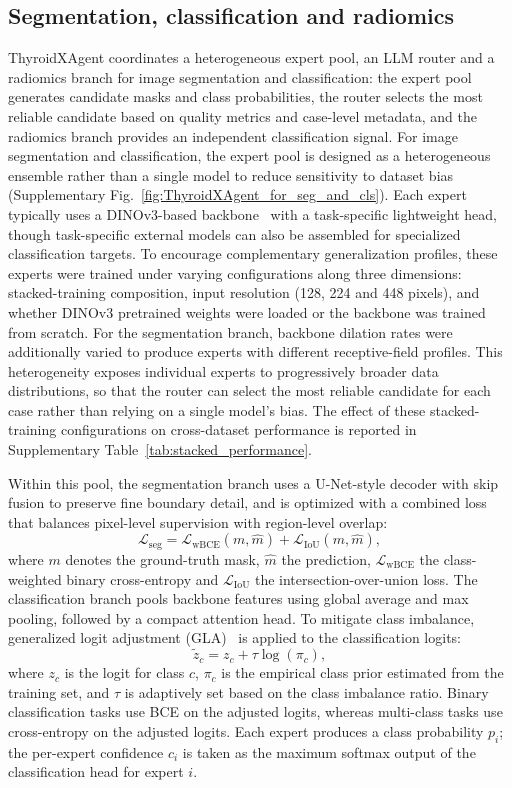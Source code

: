 \documentclass[fleqn,10pt]{wlscirep}
\begin{document}
\subsection{Segmentation, classification and radiomics}
ThyroidXAgent coordinates a heterogeneous expert pool, an LLM router and a radiomics branch for image segmentation and classification: the expert pool generates candidate masks and class probabilities, the router selects the most reliable candidate based on quality metrics and case-level metadata, and the radiomics branch provides an independent classification signal. For image segmentation and classification, the expert pool is designed as a heterogeneous ensemble rather than a single model to reduce sensitivity to dataset bias~\cite{torralba2011unbiased,liu2024decade} (Supplementary Fig.~\ref{fig:ThyroidXAgent_for_seg_and_cls}). Each expert typically uses a DINOv3-based backbone~\cite{simeoni2025dinov3} with a task-specific lightweight head, though task-specific external models can also be assembled for specialized classification targets. To encourage complementary generalization profiles, these experts were trained under varying configurations along three dimensions: stacked-training composition, input resolution (128, 224 and 448 pixels), and whether DINOv3 pretrained weights were loaded or the backbone was trained from scratch. For the segmentation branch, backbone dilation rates were additionally varied to produce experts with different receptive-field profiles. This heterogeneity exposes individual experts to progressively broader data distributions, so that the router can select the most reliable candidate for each case rather than relying on a single model's bias. The effect of these stacked-training configurations on cross-dataset performance is reported in Supplementary Table~\ref{tab:stacked_performance}.

Within this pool, the segmentation branch uses a U-Net-style decoder with skip fusion to preserve fine boundary detail, and is optimized with a combined loss that balances pixel-level supervision with region-level overlap:
\[
\mathcal{L}_{\text{seg}} = \mathcal{L}_{\text{wBCE}}(m, \hat{m}) + \mathcal{L}_{\text{IoU}}(m, \hat{m}),
\]
where $m$ denotes the ground-truth mask, $\hat{m}$ the prediction, $\mathcal{L}_{\text{wBCE}}$ the class-weighted binary cross-entropy and $\mathcal{L}_{\text{IoU}}$ the intersection-over-union loss. The classification branch pools backbone features using global average and max pooling, followed by a compact attention head. To mitigate class imbalance, generalized logit adjustment (GLA)~\cite{menon2020long} is applied to the classification logits:
\[
\tilde{z}_c = z_c + \tau\log(\pi_c),
\]
where $z_c$ is the logit for class $c$, $\pi_c$ is the empirical class prior estimated from the training set, and $\tau$ is adaptively set based on the class imbalance ratio. Binary classification tasks use BCE on the adjusted logits, whereas multi-class tasks use cross-entropy on the adjusted logits. Each expert produces a class probability $p_i$; the per-expert confidence $c_i$ is taken as the maximum softmax output of the classification head for expert $i$.
\end{document}
